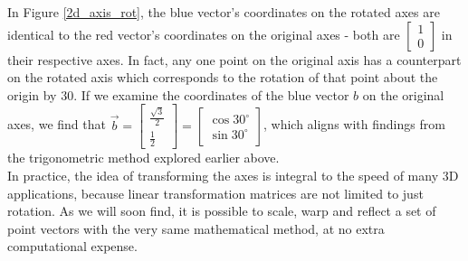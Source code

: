 \documentclass[12pt, a4paper]{article}
\begin{document}
In Figure \ref{2d_axis_rot}, the blue vector's coordinates on the rotated axes
are identical to the red vector's coordinates on the original axes - both are
$\begin{bmatrix}1 \\ 0\end{bmatrix}$ in their respective axes. In fact, any one
point on the original axis has a counterpart on the rotated axis which
corresponds to the rotation of that point about the origin by $30$\textdegree.
If we examine the coordinates of the blue vector $b$ on the original axes, we
find that
$
    \vec{b}
    =
    \begin{bmatrix}
        \frac{\sqrt{3}}{2}\\ \frac{1}{2}
    \end{bmatrix}
    =
    \begin{bmatrix}
        \cos 30^\circ \\
        \sin 30^\circ
    \end{bmatrix}
$, which aligns with findings from the trigonometric method explored earlier above. \\

In practice, the idea of transforming the axes is integral to the speed of many
3D applications, because linear transformation matrices are not limited to just
rotation. As we will soon find, it is possible to scale, warp and reflect a set
of point vectors with the very same mathematical method, at no extra
computational expense.
\end{document}
